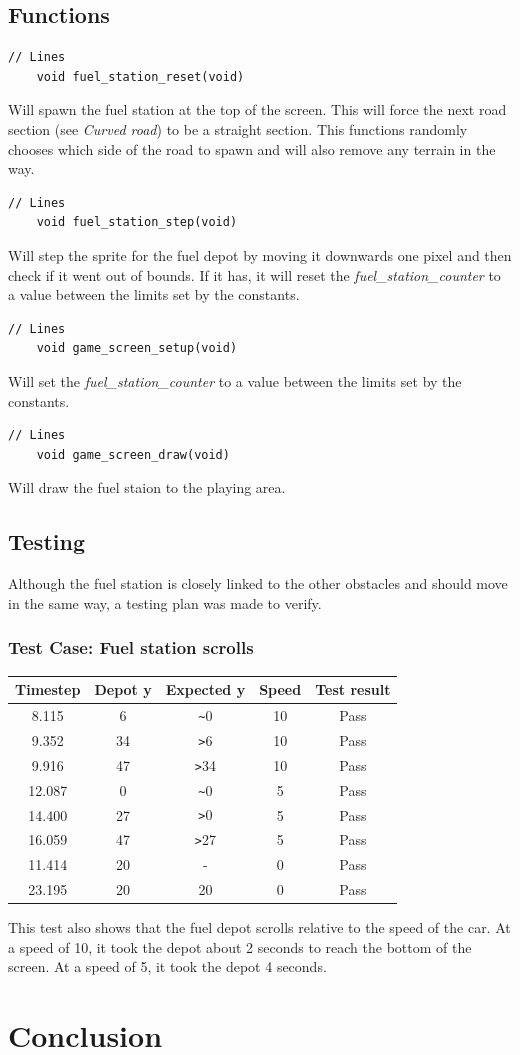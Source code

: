 \documentclass{article}
\begin{document}
\subsection*{Functions}
\begin{lstlisting}[style=CStyle]
	// Lines 
	void fuel_station_reset(void)
\end{lstlisting}
Will spawn the fuel station at the top of the screen. This will force the next road section (see \emph{Curved road}) to be a straight section. This functions randomly chooses which side of the road to spawn and will also remove any terrain in the way.
\begin{lstlisting}[style=CStyle]
	// Lines 
	void fuel_station_step(void)
\end{lstlisting}
Will step the sprite for the fuel depot by moving it downwards one pixel and then check if it went out of bounds. If it has, it will reset the \emph{fuel\_station\_counter} to a value between the limits set by the constants.
\begin{lstlisting}[style=CStyle]
	// Lines 
	void game_screen_setup(void)
\end{lstlisting}
Will set the \emph{fuel\_station\_counter} to a value between the limits set by the constants. 
\begin{lstlisting}[style=CStyle]
	// Lines 
	void game_screen_draw(void)
\end{lstlisting}
Will draw the fuel staion to the playing area. 
\newpage

\subsection*{Testing}
Although the fuel station is closely linked to the other obstacles and should move in the same way, a testing plan was made to verify. 
\subsubsection*{Test Case: Fuel station scrolls}
\begin{center}
\begin{tabular}{ c c c c c }
Timestep	& Depot y	& Expected y 	& Speed	& Test result		\\ \hline
8.115		& 6		& \verb|~|0		& 10		& Pass		\\
9.352		& 34		& \verb|>|6		& 10		& Pass		\\
9.916		& 47		& \verb|>|34	& 10		& Pass		\\
12.087	& 0		& \verb|~|0		& 5		& Pass		\\
14.400	& 27		& \verb|>|0		& 5		& Pass		\\
16.059	& 47		& \verb|>|27	& 5		& Pass		\\
11.414	& 20		& - 			& 0		& Pass		\\
23.195	& 20		& 20			& 0		& Pass		\\ \hline
\end{tabular}
\end{center}
This test also shows that the fuel depot scrolls relative to the speed of the car. At a speed of 10, it took the depot about 2 seconds to reach the bottom of the screen. At a speed of 5, it took the depot 4 seconds.
\clearpage

\section{Conclusion}
\end{document}
